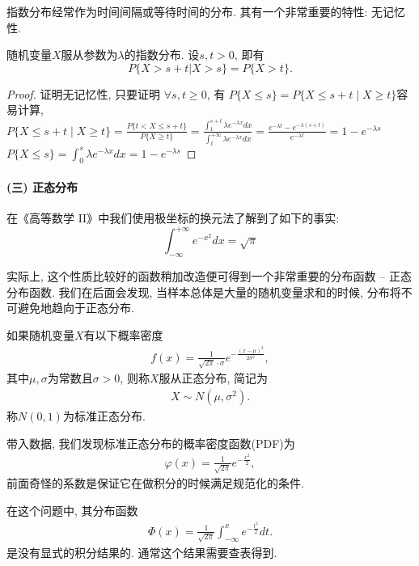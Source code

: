 指数分布经常作为时间间隔或等待时间的分布. 其有一个非常重要的特性: 无记忆性.

\begin{proposition}[指数分布的无记忆性]
    随机变量$X$服从参数为$\lambda$的指数分布. 设$s,t>0$, 即有
    \[ P\{X>s+t|X>s\}=P\{X>t\}.\]
\end{proposition}

\begin{proof}
    证明无记忆性, 只要证明 $\forall s, t \geq 0$, 有 $P\{X \leq s\}=P\{X \leq s+t \mid X \geq t\}$容易计算, $P\{X \leq s+t \mid X \geq t\}=\frac{P\{t<X \leq s+t\}}{P\{X \geq t\}}=\frac{\int_1^{s+t} \lambda e^{-\lambda x} d x}{\int_t^{+\infty} \lambda e^{-\lambda x} d x}=\frac{e^{-\lambda t}-e^{-\lambda(s+t)}}{e^{-\lambda t}}=1-e^{-\lambda s}$ $P\{X \leq s\}=\int_0^s \lambda e^{-\lambda x} d x=1-e^{-\lambda s}$
\end{proof}

\paragraph{(三) 正态分布}

在《高等数学 II》中我们使用极坐标的换元法了解到了如下的事实:
$$
    \int_{-\infty}^{+\infty}e^{-x^2} dx =\sqrt \pi
$$

实际上, 这个性质比较好的函数稍加改造便可得到一个非常重要的分布函数 --
正态分布函数. 我们在后面会发现, 当样本总体是大量的随机变量求和的时候,
分布将不可避免地趋向于正态分布.

\begin{definition}
    如果随机变量$X$有以下概率密度
    \begin{align*}
        f(x)=\frac1{\sqrt{2\pi}\cdot\sigma}e^{-\frac{(x-\mu)^2}{2\sigma^2}},
    \end{align*}
    其中$\mu,\sigma$为常数且$\sigma>0$, 则称$X$服从正态分布, 简记为%
    \begin{align*}
        X \sim N(\mu,\sigma^2).
    \end{align*}
    称$N(0,1)$为标准正态分布.
\end{definition}

带入数据, 我们发现标准正态分布的概率密度函数(PDF)为
\begin{align*}
    \varphi(x)=\frac1{\sqrt{2\pi}}e^{-\frac{x^2}{2}},
\end{align*}
前面奇怪的系数是保证它在做积分的时候满足规范化的条件.

在这个问题中, 其分布函数
\begin{align*}
    \Phi(x)=\frac1{\sqrt{2\pi}}\int_{-\infty}^xe^{-\frac{t^2}{2}}dt.
\end{align*}
是没有显式的积分结果的. 通常这个结果需要查表得到.

